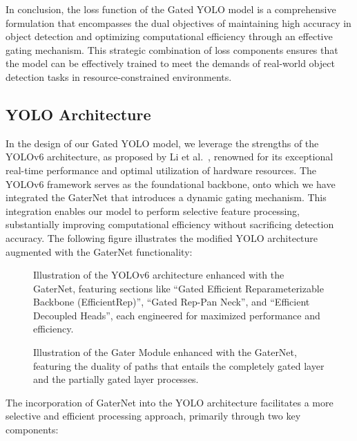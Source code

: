 In conclusion, the loss function of the Gated YOLO model is a comprehensive formulation that encompasses the dual objectives of maintaining high accuracy in object detection and optimizing computational efficiency through an effective gating mechanism. This strategic combination of loss components ensures that the model can be effectively trained to meet the demands of real-world object detection tasks in resource-constrained environments.

\subsection{YOLO Architecture}

In the design of our Gated YOLO model, we leverage the strengths of the YOLOv6 architecture, as proposed by Li et al.~\cite{li2023yolov6,li2022yolov6}, renowned for its exceptional real-time performance and optimal utilization of hardware resources. The YOLOv6 framework serves as the foundational backbone, onto which we have integrated the GaterNet that introduces a dynamic gating mechanism. This integration enables our model to perform selective feature processing, substantially improving computational efficiency without sacrificing detection accuracy. The following figure illustrates the modified YOLO architecture augmented with the GaterNet functionality:

\begin{figure}[ht]
    \centering
    
    \caption{Illustration of the YOLOv6 architecture enhanced with the GaterNet, featuring sections like ``Gated Efficient Reparameterizable Backbone (EfficientRep)'', ``Gated Rep-Pan Neck'', and ``Efficient Decoupled Heads'', each engineered for maximized performance and efficiency.}
    \label{fig:yolo_architecture}
    \end{figure}

\begin{figure}[ht]
    \centering
    
    \caption{Illustration of the Gater Module enhanced with the GaterNet, featuring the duality of paths that entails the completely gated layer and the partially gated layer processes.}
    \label{fig:gating_mechanism}
    \end{figure}

The incorporation of GaterNet into the YOLO architecture facilitates a more selective and efficient processing approach, primarily through two key components:

